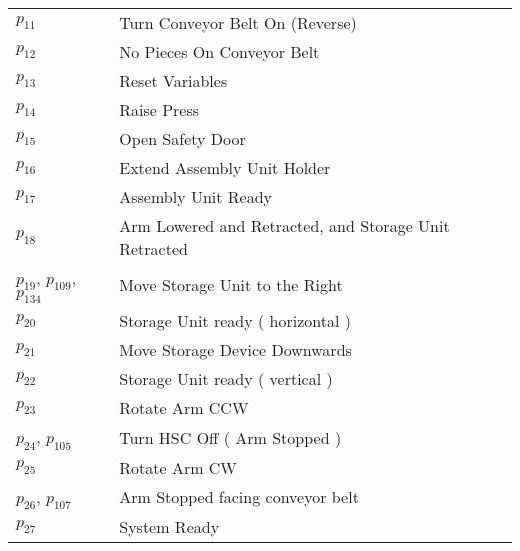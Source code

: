 \begin{longtable}{M{5cm}M{10cm}}
\hyperlink{completeNet:p11}{\hypertarget{completeTable:p11}{$p_{11}$}} & Turn Conveyor Belt On (Reverse)\\
\hyperlink{completeNet:p12}{\hypertarget{completeTable:p12}{$p_{12}$}} & No Pieces On Conveyor Belt\\
\hyperlink{completeNet:p13}{\hypertarget{completeTable:p13}{$p_{13}$}} & Reset Variables\\
\hyperlink{completeNet:p14}{\hypertarget{completeTable:p14}{$p_{14}$}} & Raise Press\\
\hyperlink{completeNet:p15}{\hypertarget{completeTable:p15}{$p_{15}$}} & Open Safety Door\\
\hyperlink{completeNet:p16}{\hypertarget{completeTable:p16}{$p_{16}$}} & Extend Assembly Unit Holder\\
\hyperlink{completeNet:p17}{\hypertarget{completeTable:p17}{$p_{17}$}} & Assembly Unit Ready\\
\hyperlink{completeNet:p18}{\hypertarget{completeTable:p18}{$p_{18}$}} & Arm Lowered and Retracted, and Storage Unit Retracted\\
\hyperlink{completeNet:p19}{\hypertarget{completeTable:p19}{$p_{19}$}}, \hyperlink{completeNet:p109}{\hypertarget{completeTable:p109}{$p_{109}$}}, \hyperlink{completeNet:p134}{\hypertarget{completeTable:p134}{$p_{134}$}} & Move Storage Unit to the Right\\
\hyperlink{completeNet:p20}{\hypertarget{completeTable:p20}{$p_{20}$}} & Storage Unit ready ( horizontal )\\
\hyperlink{completeNet:p21}{\hypertarget{completeTable:p21}{$p_{21}$}} & Move Storage Device Downwards\\
\hyperlink{completeNet:p22}{\hypertarget{completeTable:p22}{$p_{22}$}} & Storage Unit ready ( vertical )\\
\hyperlink{completeNet:p23}{\hypertarget{completeTable:p23}{$p_{23}$}} & Rotate Arm CCW\\
\hyperlink{completeNet:p24}{\hypertarget{completeTable:p24}{$p_{24}$}}, \hyperlink{completeNet:p105}{\hypertarget{completeTable:p105}{$p_{105}$}} & Turn HSC Off ( Arm Stopped )\\
\hyperlink{completeNet:p25}{\hypertarget{completeTable:p25}{$p_{25}$}} & Rotate Arm CW\\
\hyperlink{completeNet:p26}{\hypertarget{completeTable:p26}{$p_{26}$}}, \hyperlink{completeNet:p107}{\hypertarget{completeTable:p107}{$p_{107}$}} & Arm Stopped facing conveyor belt\\
\hyperlink{completeNet:p27}{\hypertarget{completeTable:p27}{$p_{27}$}} & System Ready\\

\end{longtable}
